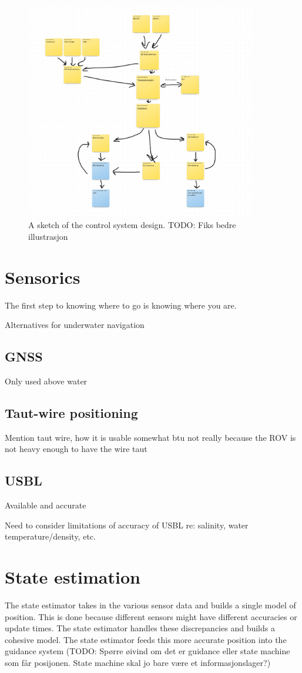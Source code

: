 \documentclass[class=article, crop=false, draft=true]{standalone}
\begin{document}
\begin{figure}
    \centering
    \includegraphics[width=0.9\textwidth]{control-system}
    \caption{A sketch of the control system design. TODO: Fiks bedre illustrasjon}
    \label{fig:control-system}
\end{figure}

\section{Sensorics}
The first step to knowing where to go is knowing where you are.

Alternatives for underwater navigation
\subsection{GNSS}
Only used above water
\subsection{Taut-wire positioning}
Mention taut wire, how it is usable somewhat btu not really because the ROV is not heavy enough to have the wire taut
\subsection{USBL}
Available and accurate

Need to consider limitations of accuracy of USBL re: salinity, water temperature/density, etc.

\section{State estimation}
The state estimator takes in the various sensor data and builds a single model of position. This is done because different sensors might have different accuracies or update times. The state estimator handles these discrepancies and builds a cohesive model. The state estimator feeds this more accurate position into the guidance system (TODO: Spørre øivind om det er guidance eller state machine som får posijonen. State machine skal jo bare være et informasjonslager?)
\end{document}
